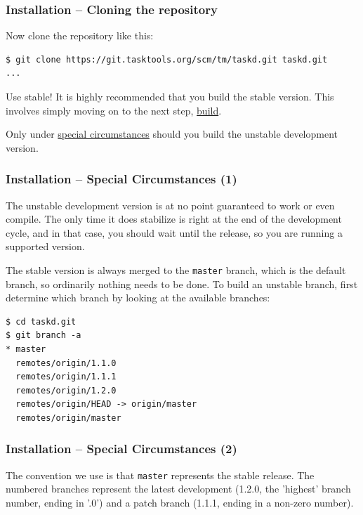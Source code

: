 \documentclass[t,handout]{beamer}
\begin{document}
\begin{frame}[fragile]\frametitle{Installation -- Cloning the repository}\label{cloning}
    \vfill
    Now clone the repository like this:

    \begin{lstlisting}
$ git clone https://git.tasktools.org/scm/tm/taskd.git taskd.git
...\end{lstlisting}

    \vfill
    \begin{alertblock}{Use stable!}
        It is highly recommended that you build the stable version. This involves simply moving on to the next step, \hyperlink{buildgit}{build}.

        Only under \hyperlink{special}{special circumstances} should you build the unstable development version.
    \end{alertblock}
\end{frame}

\begin{frame}[fragile]\frametitle{Installation -- Special Circumstances (1)}\label{special}
    \vfill
    The unstable development version is at no point guaranteed to work or even compile. The only time it does stabilize is right at the end of the development cycle, and in that case, you should wait until the release, so you are running a supported version.

    The stable version is always merged to the \verb+master+ branch, which is the default branch, so ordinarily nothing needs to be done. To build an unstable branch, first determine which branch by looking at the available branches:

    \begin{lstlisting}
$ cd taskd.git
$ git branch -a
* master
  remotes/origin/1.1.0
  remotes/origin/1.1.1
  remotes/origin/1.2.0
  remotes/origin/HEAD -> origin/master
  remotes/origin/master\end{lstlisting}
\end{frame}

\begin{frame}[fragile]\frametitle{Installation -- Special Circumstances (2)}
    \vfill
    The convention we use is that \verb+master+ represents the stable release.  The numbered branches represent the latest development (1.2.0, the 'highest' branch number, ending in '.0') and a patch branch (1.1.1, ending in a non-zero number).
\end{frame}
\end{document}
